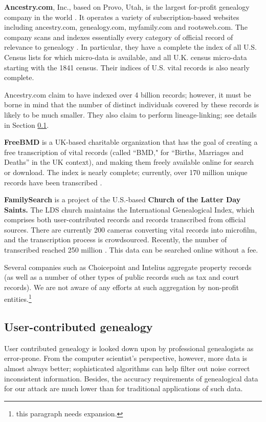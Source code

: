 \documentclass{article}
\begin{document}
{\bf Ancestry.com}, Inc., based on Provo, Utah, is the largest for-profit genealogy company in the world \cite{wp-ancestry.com}. It operates a variety of subscription-based websites including ancestry.com, genealogy.com, myfamily.com and rootsweb.com. The company scans and indexes essentially every category of official record of relevance to genealogy \cite{ancestry.com-cardcatalog}. In particular, they have a complete the index of all U.S. Census lists for which micro-data is available, and all U.K. census micro-data starting with the 1841 census. Their indices of U.S. vital records is also nearly complete. 

Ancestry.com claim to have indexed over 4 billion records; however, it must be borne in mind that the number of distinct individuals covered by these records is likely to be much smaller. They also claim to perform lineage-linking; see details in Section \ref{genealogy-user}.

{\bf FreeBMD} is a UK-based charitable organization that has the goal of creating a free transcription of vital records (called ``BMD," for ``Births, Marriages and Deaths'' in the UK context), and making them freely available online for search or download.  The index is nearly complete; currently, over 170 million unique records have been transcribed \cite{freebmd}.

{\bf FamilySearch} is a project of the U.S.-based {\bf Church of the  Latter Day Saints.} The LDS church maintains the International Genealogical Index, which comprises both user-contributed records and records transcribed from official sources. There are currently 200 cameras converting vital records into microfilm, and the transcription process is crowdsourced. Recently, the number of transcribed reached 250 million \cite{familysearch-250m,familysearch-indexing}. This data can be searched online without a fee.

Several companies such as Choicepoint and Intelius aggregate property records (as well as a number of other types of public records such as tax and court records). We are not aware of any efforts at such aggregation by non-profit entities.\footnote{this paragraph needs expansion.}

\subsection{User-contributed genealogy}
\label{genealogy-user}
User contributed genealogy is looked down upon by professional genealogists as error-prone. From the computer scientist's perspective, however, more data is almost always better; sophisticated algorithms can help filter out noise correct inconsistent information. Besides, the accuracy requirements of genealogical data for our attack are much lower than for traditional applications of such data.
\end{document}
